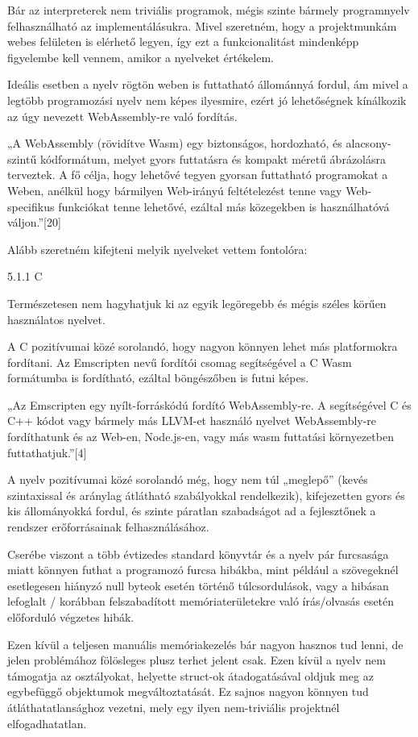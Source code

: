 Bár az interpreterek nem triviális programok, mégis szinte bármely programnyelv felhasználható az implementálásukra. Mivel szeretném, hogy a projektmunkám webes felületen is elérhető legyen, így ezt a funkcionalitást mindenképp figyelembe kell vennem, amikor a nyelveket értékelem.

Ideális esetben a nyelv rögtön weben is futtatható állománnyá fordul, ám mivel a legtöbb programozási nyelv nem képes ilyesmire, ezért jó lehetőségnek kínálkozik az úgy nevezett WebAssembly-re való fordítás.

„A WebAssembly (rövidítve Wasm) egy biztonságos, hordozható, és alacsony-szintű kódformátum, melyet gyors futtatásra és kompakt méretű ábrázolásra terveztek. A fő célja, hogy lehetővé tegyen gyorsan futtatható programokat a Weben, anélkül hogy bármilyen Web-irányú feltételezést tenne vagy Web-specifikus funkciókat tenne lehetővé, ezáltal más közegekben is használhatóvá váljon.”[20]

Alább szeretném kifejteni melyik nyelveket vettem fontolóra:

5.1.1 C

Természetesen nem hagyhatjuk ki az egyik legöregebb és mégis széles körűen használatos nyelvet.

A C pozitívumai közé sorolandó, hogy nagyon könnyen lehet más platformokra fordítani. Az Emscripten nevű fordítói csomag segítségével a C Wasm formátumba is fordítható, ezáltal böngészőben is futni képes.

„Az Emscripten egy nyílt-forráskódú fordító WebAssembly-re. A segítségével C és C++ kódot vagy bármely más LLVM-et használó nyelvet WebAssembly-re fordíthatunk és az Web-en, Node.js-en, vagy más wasm futtatási környezetben futtathatjuk.”[4]

A nyelv pozitívumai közé sorolandó még, hogy nem túl „meglepő” (kevés szintaxissal és aránylag átlátható szabályokkal rendelkezik), kifejezetten gyors és kis állományokká fordul, és szinte páratlan szabadságot ad a fejlesztőnek a rendszer erőforrásainak felhasználásához.

Cserébe  viszont a több évtizedes standard könyvtár és a nyelv pár furcsasága miatt könnyen futhat a programozó furcsa hibákba, mint például a szövegeknél esetlegesen hiányzó null byteok esetén történő túlcsordulások, vagy a hibásan lefoglalt / korábban felszabadított memóriaterületekre való írás/olvasás esetén előforduló végzetes hibák.

Ezen kívül a teljesen manuális memóriakezelés bár nagyon hasznos tud lenni, de jelen problémához fölösleges plusz terhet jelent csak. Ezen kívül a nyelv nem támogatja az osztályokat, helyette struct-ok átadogatásával oldjuk meg az egybefüggő objektumok megváltoztatását. Ez sajnos nagyon könnyen tud átláthatatlansághoz vezetni, mely egy ilyen nem-triviális projektnél elfogadhatatlan.

